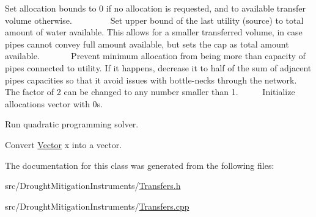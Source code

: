 Set allocation bounds to 0 if no allocation is requested, and to available transfer volume otherwise. ~\newline
~\newline
~\newline
~\newline
~\newline
 Set upper bound of the last utility (source) to total amount of water available. This allows for a smaller transferred volume, in case pipes cannot convey full amount available, but sets the cap as total amount available. ~\newline
~\newline
~\newline
~\newline
 Prevent minimum allocation from being more than capacity of pipes connected to utility. If it happens, decrease it to half of the sum of adjacent pipes capacities so that it avoid issues with bottle-\/necks through the network. The factor of 2 can be changed to any number smaller than 1. ~\newline
~\newline
~\newline
 Initialize allocations vector with 0s.

Run quadratic programming solver.

Convert \mbox{\hyperlink{classVector}{Vector}} x into a vector. 

The documentation for this class was generated from the following files\+:\begin{DoxyCompactItemize}
\item 
src/\+Drought\+Mitigation\+Instruments/\mbox{\hyperlink{Transfers_8h}{Transfers.\+h}}\item 
src/\+Drought\+Mitigation\+Instruments/\mbox{\hyperlink{Transfers_8cpp}{Transfers.\+cpp}}\end{DoxyCompactItemize}
